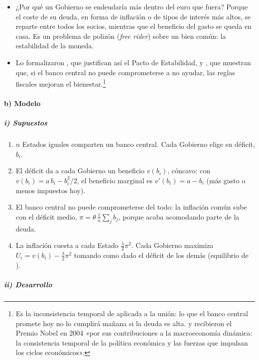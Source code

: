 \documentclass[11pt]{article}
\begin{document}
\begin{itemize}
\item ¿Por qué un Gobierno se endeudaría más dentro del euro que fuera? Porque el coste de su deuda, en forma de inflación o de tipos de interés más altos, se reparte entre todos los socios, mientras que el beneficio del gasto se queda en casa. Es un problema de polizón (\emph{free rider}) sobre un bien común: la estabilidad de la moneda.
\item Lo formalizaron \textcite{BeetsmaUhlig1999}, que justifican así el Pacto de Estabilidad, y \textcite{ChariKehoe2007}, que muestran que, si el banco central no puede comprometerse a no ayudar, las reglas fiscales mejoran el bienestar.\footnote{Es la inconsistencia temporal de \textcite{KydlandPrescott1977Rules} aplicada a la unión: lo que el banco central promete hoy no lo cumplirá mañana si la deuda es alta.  y  recibieron el Premio Nobel en 2004 «por sus contribuciones a la macroeconomía dinámica: la consistencia temporal de la política económica y las fuerzas que impulsan los ciclos económicos»\nocite{Nobel2004KydlandPrescott}.}
\end{itemize}

\paragraph{b) Modelo}

\subparagraph{i) Supuestos}

\begin{enumerate}
\item $n$ Estados iguales comparten un banco central. Cada Gobierno elige su déficit, $b_i$.
\item El déficit da a cada Gobierno un beneficio $v(b_i)$, cóncavo: con $v(b_i)=a\,b_i-b_i^2/2$, el beneficio marginal es $v'(b_i)=a-b_i$ (más gasto o menos impuestos hoy).
\item El banco central no puede comprometerse del todo: la inflación común sube con el déficit medio, $\pi=\theta\,\frac1n\sum_jb_j$, porque acaba acomodando parte de la deuda.
\item La inflación cuesta a cada Estado $\frac{\lambda}{2}\pi^2$. Cada Gobierno maximiza $U_i=v(b_i)-\frac{\lambda}{2}\pi^2$ tomando como dado el déficit de los demás (equilibrio de ).
\end{enumerate}

\subparagraph{ii) Desarrollo}
\end{document}
